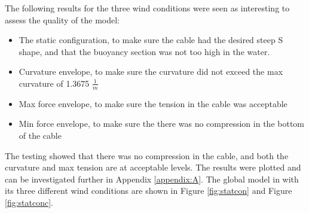 The following results for the three wind conditions were seen as interesting to assess the quality of the model:
\begin{itemize}
    \item The static configuration, to make sure the cable had the desired steep S shape, and that the buoyancy section was not too high in the water.
    \item Curvature envelope, to make sure the curvature did not exceed the max curvature of 1.3675 $\frac{1}{m}$
    \item Max force envelope, to make sure the tension in the cable was acceptable
    \item Min force envelope, to make sure the there was no compression in the bottom of the cable
\end{itemize}
The testing showed that there was no compression in the cable, and both the curvature and max tension are at acceptable levels. The results were plotted and can be investigated further in Appendix \ref{appendix:A}. \newline
\newline
The global model in with its three different wind conditions are shown in Figure \ref{fig:statcon} and Figure \ref{fig:statconc}. 
